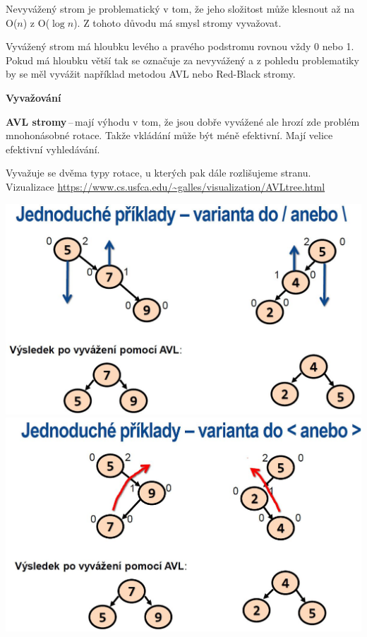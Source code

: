 Nevyvážený strom je problematický v tom, že jeho složitost může klesnout až na O($n$) z O($\log{n}$). Z tohoto důvodu má smysl stromy vyvažovat.

Vyvážený strom má hloubku levého a pravého podstromu rovnou vždy 0 nebo 1. Pokud má hloubku větší tak se označuje za nevyvážený a z pohledu problematiky by se měl vyvážit například metodou AVL nebo Red-Black stromy.

\begin{Large}\vspace{0,5cm} \textbf{Vyvažování}
\end{Large}

\textbf{AVL stromy}\,--\,mají výhodu v tom, že jsou dobře vyvážené ale hrozí zde problém mnohonásobné rotace. Takže vkládání může být méně efektivní. Mají velice efektivní vyhledávání.

Vyvažuje se dvěma typy rotace, u kterých pak dále rozlišujeme stranu. Vizualizace \url{https://www.cs.usfca.edu/~galles/visualization/AVLtree.html}



\includegraphics[scale=0.3]{images/Rotation1Type.JPG}
\includegraphics[scale=0.3]{images/Rotation2Type.JPG}


